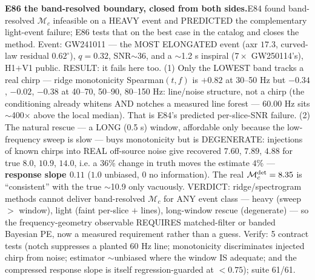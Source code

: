 \documentclass[10pt]{article}
\newcommand{\entry}[2]{\vspace{5pt}\noindent\textbf{#1}\quad #2\par}
\begin{document}
\entry{E86 the band-resolved boundary, closed from both sides.}{E84 found band-resolved $\mathcal{M}_c$
infeasible on a HEAVY event and PREDICTED the complementary light-event failure; E86 tests that on the best
case in the catalog and closes the method. Event: GW241011 --- the MOST ELONGATED event (axr $17.3$,
curved-law residual $0.62^\circ$), $q=0.32$, SNR$\sim$36, and a $\sim$1.2 s inspiral ($7\times$
GW250114's), H1$+$V1 public. RESULT: it fails here too. (1) Only the LOWEST band tracks a real chirp ---
ridge monotonicity Spearman$(t,f)$ is $+0.82$ at 30--50 Hz but $-0.34$, $-0.02$, $-0.38$ at 40--70, 50--90,
80--150 Hz: line/noise structure, not a chirp (the conditioning already whitens AND notches a measured line
forest --- 60.00 Hz sits $\sim$400$\times$ above the local median). That is E84's predicted
per-slice-SNR failure. (2) The natural rescue --- a LONG (0.5 s) window, affordable only because the
low-frequency sweep is slow --- buys monotonicity but is DEGENERATE: injections of known chirps into REAL
off-source noise give recovered $7.60$, $7.89$, $4.88$ for true $8.0$, $10.9$, $14.0$, i.e. a $36$\% change
in truth moves the estimate $4$\% --- \textbf{response slope $0.11$} ($1.0$ unbiased, $0$ no information).
The real $\mathcal{M}_c^{\rm det}=8.35$ is ``consistent'' with the true $\sim$10.9 only vacuously. VERDICT:
ridge/spectrogram methods cannot deliver band-resolved $\mathcal{M}_c$ for ANY event class --- heavy (sweep
$>$ window), light (faint per-slice $+$ lines), long-window rescue (degenerate) --- so the
frequency-geometry observable REQUIRES matched-filter or banded Bayesian PE, now a measured requirement
rather than a guess. Verify: 5 contract tests (notch suppresses a planted 60 Hz line; monotonicity
discriminates injected chirp from noise; estimator $\sim$unbiased where the window IS adequate; and the
compressed response slope is itself regression-guarded at $<0.75$); suite 61/61.}
\end{document}
